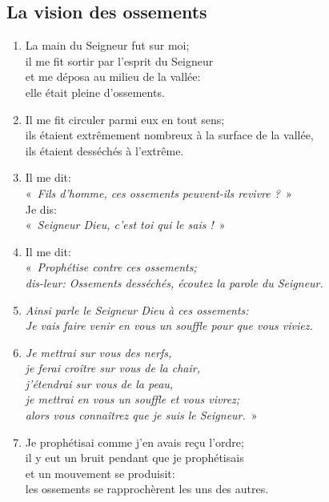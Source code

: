 \subsection*{La vision des ossements}
\begin{enumerate}[leftmargin=\psleftmargin, labelsep = \pslabelsep, label={\arabic*}, font=\color{\pscolor}\small\textsuperscript, parsep=0em, itemsep=0em, topsep=0em ]
    \item La main du Seigneur fut sur moi; \\ il me fit sortir par l’esprit du Seigneur \\ et me déposa au milieu de la vallée: \\ elle était pleine d’ossements.
    \item Il me fit circuler parmi eux en tout sens; \\ ils étaient extrêmement nombreux à la surface de la vallée, \\ ils étaient desséchés à l'extrême.
    \item Il me dit: \\ \decalage «~\textit{Fils d’homme, ces ossements peuvent-ils revivre ?}~» \\ Je dis: \\
          \decalage «~\textit{Seigneur Dieu, c’est toi qui le sais !}~»
    \item Il me dit: \\ \decalage «~\textit{Prophétise contre ces ossements; \\ \decalage dis-leur: Ossements desséchés, écoutez la parole du Seigneur.}
    \item \decalage \textit{Ainsi parle le Seigneur Dieu à ces ossements: \\ \decalage Je vais faire venir en vous un souffle pour que vous viviez.}
    \item \decalage \textit{Je mettrai sur vous des nerfs, \\ \decalage je ferai croître sur vous de la chair, \\ \decalage j’étendrai sur vous de la peau, \\ \decalage je mettrai en vous un souffle et vous vivrez; \\ \decalage alors vous connaîtrez que je suis le Seigneur.}~»
    \item Je prophétisai comme j’en avais reçu l’ordre; \\ il y eut un bruit pendant que je prophétisais \\ et un mouvement se produisit: \\ les ossements se rapprochèrent les uns des autres.

\end{enumerate}
